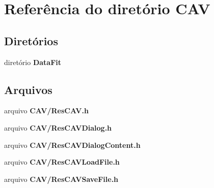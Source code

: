 \section{Referência do diretório C\+AV}
\label{dir_331b1eae61876d6af55e3ddd7177123b}
\subsection*{Diretórios}
\begin{DoxyCompactItemize}
\item 
diretório {\bf Data\+Fit}
\end{DoxyCompactItemize}
\subsection*{Arquivos}
\begin{DoxyCompactItemize}
\item 
arquivo {\bf C\+A\+V/\+Res\+C\+A\+V.\+h}
\item 
arquivo {\bf C\+A\+V/\+Res\+C\+A\+V\+Dialog.\+h}
\item 
arquivo {\bf C\+A\+V/\+Res\+C\+A\+V\+Dialog\+Content.\+h}
\item 
arquivo {\bf C\+A\+V/\+Res\+C\+A\+V\+Load\+File.\+h}
\item 
arquivo {\bf C\+A\+V/\+Res\+C\+A\+V\+Save\+File.\+h}
\end{DoxyCompactItemize}
